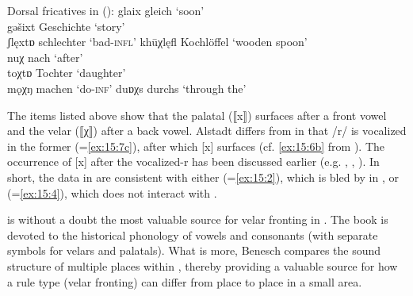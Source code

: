 {\ea%
\label{ex:15:7}Dorsal fricatives in  ():
\ea\label{ex:15:7a} glaix \tab [glaiç] \tab gleich \tab ‘soon’\\
gəšixt \tab [gəʃiçt] \tab Geschichte \tab ‘story’\\
ʃlęxtɒ \tab [ʃlɛçtɐ] \tab schlechter \tab ‘bad-\textsc{infl}’
\ex\label{ex:15:7b} khūχlęfl \tab [kʰuːxlɛfl̥] \tab Kochlöffel \tab ‘wooden spoon’\\
nuχ \tab  [nux] \tab nach \tab ‘after’\\
toχtɒ \tab [toxtɐ] \tab Tochter \tab ‘daughter’\\
mǫχŋ \tab [mɔxŋ] \tab machen \tab ‘do-\textsc{inf}’
\ex\label{ex:15:7c} duɒχs \tab [duɐxs] \tab durchs \tab ‘through the’
\z
\z 

The items listed above show that the palatal (⟦x⟧) surfaces after a front vowel and the velar (⟦χ⟧) after a back vowel. Alstadt differs from  in that /r/ is vocalized in the former (=\ref{ex:15:7c}), after which [x] surfaces (cf. \ref{ex:15:6b} from ). The occurrence of [x] after the vocalized-r has been discussed earlier (e.g. , , ). In short, the data in  are consistent with either  (=\ref{ex:15:2}), which is bled by  in , or  (=\ref{ex:15:4}), which does not interact with .

\citet{Benesch1979} is without a doubt the most valuable source for velar fronting in . The book is devoted to the historical phonology of vowels and consonants (with separate symbols for velars and palatals). What is more, Benesch compares the sound structure of multiple places within , thereby providing a valuable source for how a rule type (velar fronting) can differ from place to place in a small area.

}
